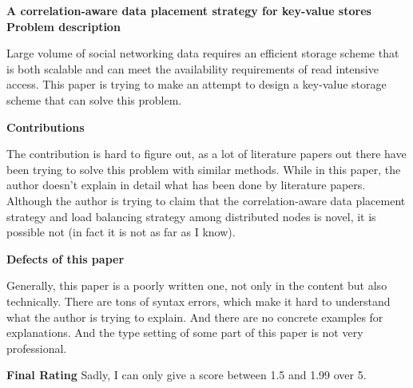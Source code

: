 \documentclass[16pt]{report}
\begin{document}
\textbf{\Large{A correlation-aware data placement strategy for
    key-value stores}} \\ 

\textbf{Problem description}

Large volume of social networking data requires an efficient storage
scheme that is both scalable and can meet the availability
requirements of read intensive access. This paper is trying to make an
attempt to design a key-value storage scheme that can solve this
problem. 

\textbf{Contributions}

The contribution is hard to figure out, as a lot of literature papers
out there have been trying to solve this problem with similar
methods. While in this paper, the author doesn't explain in detail what
has been done by literature papers. Although the author is trying to
claim that the correlation-aware data placement strategy and load
balancing strategy among distributed nodes is novel, it is possible
not (in fact it is not as far as I know). 

\textbf{Defects of this paper}

Generally, this paper is a poorly written one, not only in the content
but also technically. There are tons of syntax errors, which make it
hard to understand what the author is trying to explain. And there are no
concrete examples for explanations. And the type setting of some part
of this paper is not very professional. 

\textbf{Final Rating}
Sadly, I can only give a score between 1.5 and 1.99 over 5. 
\end{document}
